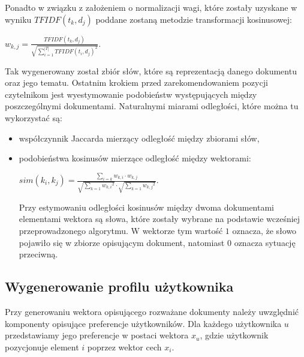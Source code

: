 \documentclass[12pt,a4paper]{report}
\begin{document}
Ponadto w związku z założeniem o normalizacji wagi, które zostały uzyskane w wyniku \begin{math}
TFIDF(t_k, d_j)
\end{math} poddane zostaną metodzie transformacji kosinusowej: 
\begin{center}
\begin{math}
w_{k,j} = \frac{TFIDF(t_k, d_j)}{\sqrt{\sum_{i=1}^{|T|}{TFIDF(t_i, d_j)}^2}}.
\end{math}
\end{center}
Tak wygenerowany został zbiór słów, które są reprezentacją danego dokumentu oraz jego tematu. Ostatnim krokiem przed zarekomendowaniem pozycji czytelnikom jest wyestymowanie podobieństw występujących między poszczególnymi dokumentami. Naturalnymi miarami odległości, które można tu wykorzystać są:
\begin{itemize}
\item współczynnik Jaccarda mierzący odległość między zbiorami słów,
\item podobieństwa kosinusów mierzące odległość między wektorami:

\begin{center}
\begin{math}
sim(k_i,k_j) = \frac{\sum_{i=k} w_{k,i}\cdot w_{k,j}}{\sqrt{\sum_{k=1}{w_{k,i}}^2} \cdot \sqrt{\sum_{k=1}{w_{k,j}}^2}}.
\end{math}
\end{center}
Przy estymowaniu odległości kosinusów między dwoma dokumentami elementami wektora są słowa, które zostały wybrane na podstawie wcześniej przeprowadzonego algorytmu. W wektorze tym wartość $1$ oznacza, że słowo pojawiło się w zbiorze opisującym dokument, natomiast $0$ oznacza sytuację przeciwną.
\end{itemize}

\subsection{Wygenerowanie profilu użytkownika}
Przy generowaniu wektora opisującego rozważane dokumenty należy uwzględnić komponenty opisujące preferencje użytkowników. Dla każdego użytkownika $u$ przedstawiamy jego preferencje w postaci wektora $x_u$, gdzie użytkownik pozycjonuje element $i$ poprzez wektor cech $x_i$.
\end{document}
